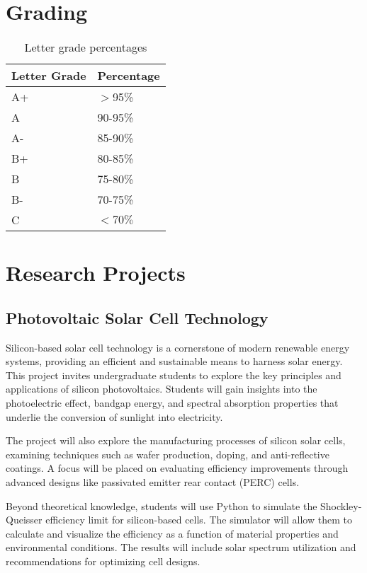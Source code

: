 \documentclass[11pt]{article}
\begin{document}
\section{Grading}
	
	\begin{table}[h!]
	    \centering
	    \begin{tabular}{|l|l|}
	         	\hline\hline
	Letter Grade	& Percentage		\\
		\hline\hline  
		A+	& $>$95\%	\\
		A	& 90-95\%	\\
		A-	& 85-90\%	\\
		B+	& 80-85\%	\\
		B & 75-80\%\\
		B-& 70-75\%\\
		C&$<70\%$\\
		\hline\hline
	    \end{tabular}
	    \caption{Letter grade percentages}
	    \label{tab:grades2}
	\end{table}
	
	\newpage
    \section{Research Projects}
\subsection{Photovoltaic Solar Cell Technology}

Silicon-based solar cell technology is a cornerstone of modern renewable energy systems, providing an efficient and sustainable means to harness solar energy. This project invites undergraduate students to explore the key principles and applications of silicon photovoltaics. Students will gain insights into the photoelectric effect, bandgap energy, and spectral absorption properties that underlie the conversion of sunlight into electricity. 

The project will also explore the manufacturing processes of silicon solar cells, examining techniques such as wafer production, doping, and anti-reflective coatings. A focus will be placed on evaluating efficiency improvements through advanced designs like passivated emitter rear contact (PERC) cells.

Beyond theoretical knowledge, students will use Python to simulate the Shockley-Queisser efficiency limit for silicon-based cells. The simulator will allow them to calculate and visualize the efficiency as a function of material properties and environmental conditions. The results will include solar spectrum utilization and recommendations for optimizing cell designs.
\end{document}
